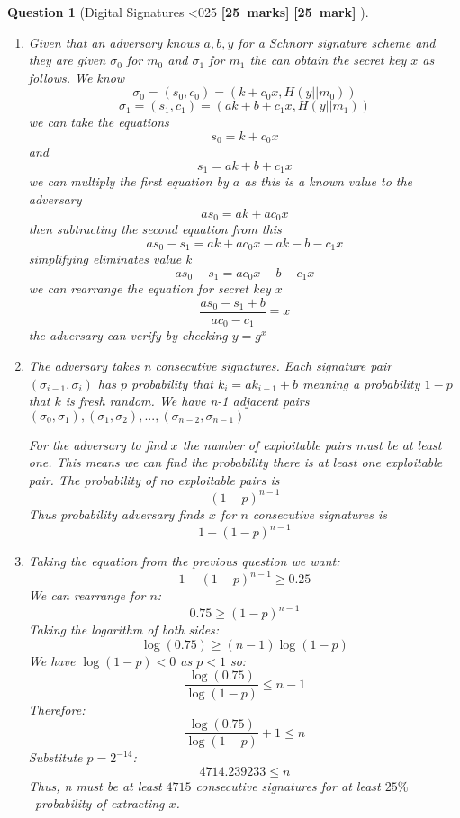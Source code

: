 \documentclass[a4paper]{article}
\theoremstyle{que}
\newtheorem{question}{Question}
\newcommand\points[1]{%
\ifnum1<0#1\relax%
    {\bf \small [#1~marks]}%
  \else%
    {\bf \small [#1~mark]}%
  \fi%
}%
\begin{document}
\begin{question}[Digital Signatures \points{25}]
\begin{enumerate}[label=(\alph*)]
    \item Given that an adversary knows \(a,b ,y\) for a Schnorr signature scheme and they are given \(\sigma_0\) for \(m_0\) and \(\sigma_1\) for \(m_1\) the can obtain the secret key \(x\) as follows. We know
    \[\sigma_0 = (s_0,c_0) = (k+c_0x,H(y||m_0))\]
    \[\sigma_1 = (s_1,c_1) = (ak+b+c_1x,H(y||m_1))\]
    we can take the equations 
    \[s_0 = k + c_0x\] and
    \[s_1 = ak+b+ c_1x\]
    we can multiply the first equation by \(a\) as this is a known value to the adversary
    \[as_0 = ak + ac_0x\]
    then subtracting the second equation from this
    \[as_0 - s_1 = ak + ac_0x - ak - b - c_1x\]
    simplifying eliminates value k
    \[as_0 - s_1 = ac_0x - b - c_1x\]
    we can rearrange the equation for secret key \(x\)
    \[\frac{as_0-s_1+b}{ac_0-c_1} = x\]
    the adversary can verify by checking \(y= g^x\) 

    \item The adversary takes n consecutive signatures. Each signature pair \((\sigma_{i-1},\sigma_i)\) has \(p\) probability that \(k_i = ak_{i-1}+b\) meaning a probability \(1 - p\) that \(k\) is fresh random. 
    We have n-1 adjacent pairs \((\sigma_0,\sigma_1),(\sigma_1,\sigma_2),...,(\sigma_{n-2},\sigma_{n-1})\)
    
    For the adversary to find \(x\) the number of exploitable pairs must be at least one. This means we can find the probability there is at least one exploitable pair.
    The probability of no exploitable pairs is 
    \[(1-p)^{n-1}\]
    Thus probability adversary finds \(x\) for \(n\) consecutive signatures is
    \[1 - (1-p)^{n-1}\]
    
    \item Taking the equation from the previous question we want:
    \[1 - (1-p)^{n-1} \geq 0.25\] 
    We can rearrange for \(n\):
    \[0.75 \geq (1-p)^{n-1}\]
    Taking the logarithm of both sides:
    \[\log(0.75) \geq (n-1)\log(1-p)\]
    We have \(\log(1-p) < 0\) as \(p<1\) so:
    \[\frac{\log(0.75)}{\log(1-p)}\leq n-1\]
    Therefore:
    \[\frac{\log(0.75)}{\log(1-p)} + 1\leq n\]
    Substitute \(p = 2^{-14}\):
    \[4714.239233 \leq n\]
    Thus, n must be at least \(4715\) consecutive signatures for at least \(25\%\)\ probability of extracting \(x\).
  \end{enumerate}
\end{question}

\newpage

\end{document}
